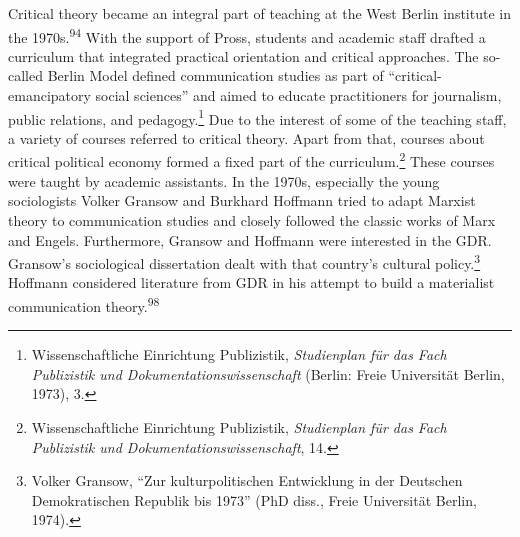\documentclass{tufte-handout}
\begin{document}
Critical theory became an integral part of teaching at the West Berlin
institute in the 1970s.\textsuperscript{94} With the support of
Pross, students and academic staff\setcounter{footnote}{94} drafted a curriculum that integrated
practical orientation and critical approaches. The so-called Berlin
Model defined communication studies as part of ``critical-emancipatory
social sciences'' and aimed to educate practitioners for journalism,
public relations, and pedagogy.\footnote{Wissenschaftliche Einrichtung
  Publizistik, \emph{Studienplan für das Fach Publizistik und
  Dokumentationswissenschaft} (Berlin: Freie Universität Berlin, 1973),
  3.} Due to the interest of some of the teaching staff, a variety of
courses referred to critical theory. Apart from that, courses about
critical political economy formed a fixed part of the
curriculum.\footnote{Wissenschaftliche Einrichtung Publizistik,
  \emph{Studienplan für das Fach Publizistik und
  Dokumentationswissenschaft}, 14.} These courses were taught by
academic assistants. In the 1970s, especially the young sociologists
Volker Gransow and Burkhard Hoffmann tried to adapt Marxist theory to
communication studies and closely followed the classic works of Marx and
Engels. Furthermore, Gransow and Hoffmann were interested in the GDR.
Gransow's sociological dissertation dealt with that country's cultural
policy.\footnote{Volker Gransow, ``Zur kulturpolitischen Entwicklung in
  der Deutschen Demokratischen Republik bis 1973'' (PhD diss., Freie
  Universität Berlin, 1974).} Hoffmann considered literature from GDR in
his attempt to build a materialist communication theory.\textsuperscript{98}
\end{document}
